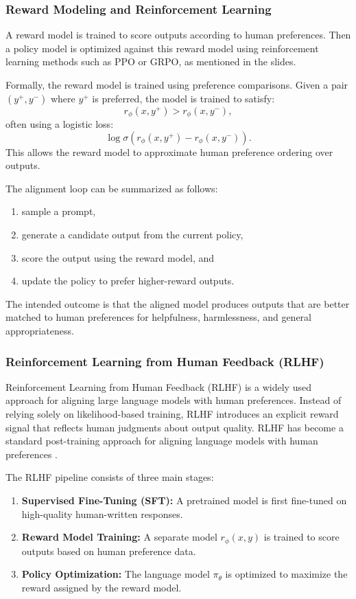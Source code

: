 \documentclass{article}
\begin{document}
\subsubsection{Reward Modeling and Reinforcement Learning}
A reward model is trained to score outputs according to human preferences. Then a policy model is optimized against this reward model using reinforcement learning methods such as PPO or GRPO, as mentioned in the slides.

Formally, the reward model is trained using preference comparisons. Given a pair $(y^+, y^-)$ where $y^+$ is preferred, the model is trained to satisfy:
\[
r_\phi(x, y^+) > r_\phi(x, y^-),
\]
often using a logistic loss:
\[
\log \sigma(r_\phi(x,y^+) - r_\phi(x,y^-)).
\]
This allows the reward model to approximate human preference ordering over outputs.

The alignment loop can be summarized as follows:
\begin{enumerate}
    \item sample a prompt,
    \item generate a candidate output from the current policy,
    \item score the output using the reward model, and
    \item update the policy to prefer higher-reward outputs.
\end{enumerate}

The intended outcome is that the aligned model produces outputs that are better matched to human preferences for helpfulness, harmlessness, and general appropriateness.

\subsubsection{Reinforcement Learning from Human Feedback (RLHF)}

Reinforcement Learning from Human Feedback (RLHF) is a widely used approach for aligning large language models with human preferences. Instead of relying solely on likelihood-based training, RLHF introduces an explicit reward signal that reflects human judgments about output quality. RLHF has become a standard post-training approach for aligning language models with human preferences \cite{bai2022helpful}.

The RLHF pipeline consists of three main stages:

\begin{enumerate}
    \item \textbf{Supervised Fine-Tuning (SFT):} A pretrained model is first fine-tuned on high-quality human-written responses.
    \item \textbf{Reward Model Training:} A separate model $r_\phi(x,y)$ is trained to score outputs based on human preference data.
    \item \textbf{Policy Optimization:} The language model $\pi_\theta$ is optimized to maximize the reward assigned by the reward model.
\end{enumerate}
\end{document}

